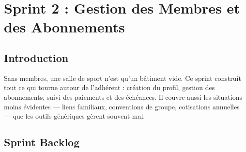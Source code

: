 ﻿\documentclass[../main.tex]{subfiles}
\begin{document}
\chapter{Sprint 2 : Gestion des Membres et des Abonnements}

\section{Introduction}

Sans membres, une salle de sport n'est qu'un b\^{a}timent vide. Ce sprint construit tout ce qui tourne autour de l'adh\'{e}rent : cr\'{e}ation du profil, gestion des abonnements, suivi des paiements et des \'{e}ch\'{e}ances. Il couvre aussi les situations moins \'{e}videntes --- liens familiaux, conventions de groupe, cotisations annuelles --- que les outils g\'{e}n\'{e}riques g\`{e}rent souvent mal.

\section{Sprint Backlog}
\end{document}
